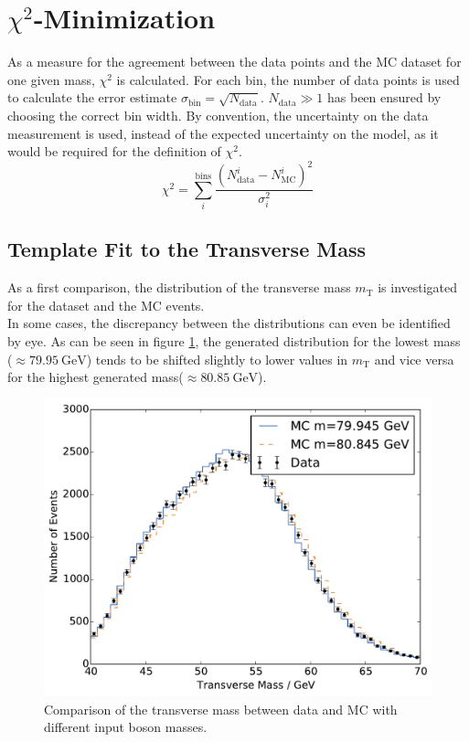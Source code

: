 \documentclass[
	paper=A4,
	parskip=full,
	chapterprefix=true,
	11pt,
	headings=normal,
	bibliography=totoc,
	listof=totoc,
	titlepage=on,
]{scrreprt}
\newcommand{\MT}{\ensuremath{{m_\mathrm{T}}}\xspace}
\begin{document}
\section{$\chi^2$-Minimization}
As a measure for the agreement between the data points and the MC dataset for one given \PW mass, $\chi^2$ is calculated. For each bin, the number of data points is used to calculate the error estimate $\sigma_\mathrm{bin}=\sqrt{N_\mathrm{data}}$. $N_\mathrm{data} \gg 1$ has been ensured by choosing the correct bin width. By convention, the uncertainty on the data measurement is used, instead of the expected uncertainty on the model, as it would be required for the definition of $\chi^2$. 
\begin{equation}
\chi^2=\sum_i^{\mathrm{bins}} \frac{\left(N^i_\mathrm{data}-N^i_\mathrm{MC}\right)^2}{\sigma_i^2}
\label{eq:Chi2}
\end{equation}

\subsection{Template Fit to the Transverse Mass}
As a first comparison, the distribution of the transverse mass \MT is investigated for the dataset and the MC events.\\
In some cases, the discrepancy between the distributions can even be identified by eye. As can be seen in figure \ref{fig:comparison_m_t}, the generated distribution for the lowest \PW mass ($\approx\SI{79.95}{\giga\electronvolt}$) tends to be shifted slightly to lower values in \MT and vice versa for the highest generated \PW mass($\approx\SI{80.85}{\giga\electronvolt}$). 
\begin{figure}
	\centering
	\includegraphics{comparison_m_t}
	\caption{Comparison of the transverse mass between data and MC with different input \PW boson masses.}
	\label{fig:comparison_m_t}
\end{figure}
\end{document}

